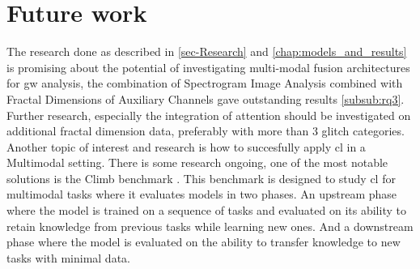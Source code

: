 \section{Future work}
The research done as described in \ref{sec-Research} and \ref{chap:models_and_results} is promising about the potential of investigating multi-modal fusion architectures for \acrshort{gw} analysis, the combination of Spectrogram Image Analysis combined with Fractal Dimensions of Auxiliary Channels gave outstanding results \ref{subsub:rq3}. \\
Further research, especially the integration of attention \citep{vaswani2017attention, niu2021review} should be investigated on additional fractal dimension data, preferably with more than 3 glitch categories. \\
Another topic of interest and research is how to succesfully apply \acrshort{cl} in a Multimodal setting. There is some research ongoing, one of the most notable solutions is the Climb benchmark \citep{srinivasan2022climb}. This benchmark is designed to study \acrshort{cl} for multimodal tasks where it evaluates models in two phases. An upstream phase where the model is trained on a sequence of tasks and evaluated on its ability to retain knowledge from previous tasks while learning new ones. And a downstream phase where the model is evaluated on the ability to transfer knowledge to new tasks with minimal data. 